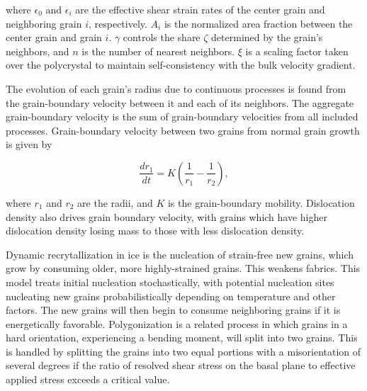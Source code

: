 \documentclass[a0,landscape]{a0poster}
\begin{document}
\begin{multicols}{3}
where $\epsilon_0$ and $\epsilon_i$ are the effective shear strain rates of the center grain and neighboring grain $i$, respectively. $A_i$ is the normalized area fraction between the center grain and grain $i$. $\gamma$ controls the share $\zeta$ determined by the grain's neighbors, and $n$ is the number of nearest neighbors. $\xi$ is a scaling factor taken over the polycrystal to maintain self-consistency with the bulk velocity gradient. 

The evolution of each grain's radius due to continuous processes is found from the grain-boundary velocity between it and each of its neighbors. The aggregate grain-boundary velocity is the sum of grain-boundary velocities from all included processes. Grain-boundary velocity between two grains from normal grain growth is given by

\begin{equation}
\frac{dr_1}{dt} = K \left( \frac{1}{r_1}-\frac{1}{r_2} \right),
\end{equation}

where $r_1$ and $r_2$ are the radii, and $K$ is the grain-boundary mobility. Dislocation density also drives grain boundary velocity, with grains which have higher dislocation density losing mass to those with less dislocation density.

Dynamic recrytallization in ice is the nucleation of strain-free new grains, which grow by consuming older, more highly-strained grains. This weakens fabrics. This model treats initial nucleation stochastically, with potential nucleation sites nucleating new grains probabilistically depending on temperature and other factors. The new grains will then begin to consume neighboring grains if it is energetically favorable. Polygonization is a related process in which grains in a hard orientation, experiencing a bending moment, will split into two grains. This is handled by splitting the grains into two equal portions with a misorientation of several degrees if the ratio of resolved shear stress on the basal plane to effective applied stress exceeds a critical value. 

\end{multicols}
\end{document}
